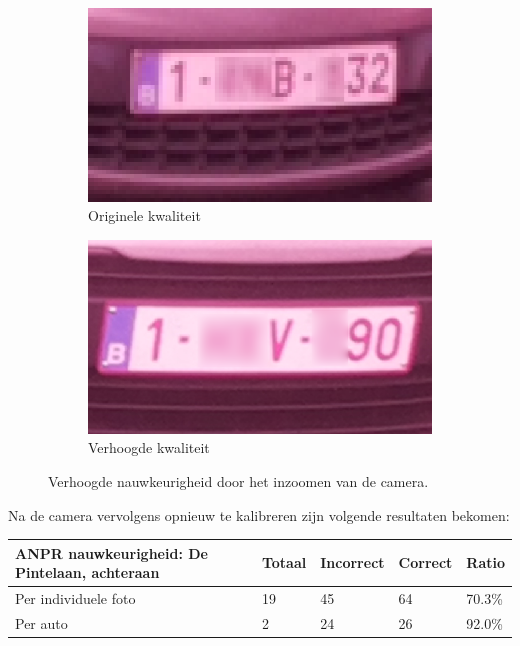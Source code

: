\begin{figure}[h!]
	\centering
	\begin{subfigure}[b]{0.49\linewidth}
		\includegraphics[width=\linewidth]{img/sterachter/sterachter2.png}
		\caption{Originele kwaliteit}
	\end{subfigure}
	\begin{subfigure}[b]{0.49\linewidth}
		\includegraphics[width=\linewidth]{img/sterachter/hressmall2.png}
		\caption{Verhoogde kwaliteit}
	\end{subfigure}
	\caption{Verhoogde nauwkeurigheid door het inzoomen van de camera.}
	\label{fig:ressterrecomparison}
\end{figure}

Na de camera vervolgens opnieuw te kalibreren zijn volgende resultaten bekomen:
\begin{table}[h!]
	\centering
	\begin{tabular}{l|l|l|l|l}
		\textbf{ANPR nauwkeurigheid: De Pintelaan, achteraan} & Totaal & Incorrect & Correct & Ratio	\\ \hline
		Per individuele foto 	& 19 & 45	& 64	& 70.3\%\\
		Per auto				& 2 & 24	& 26 	& 92.0\%\\
	\end{tabular}
\end{table}

